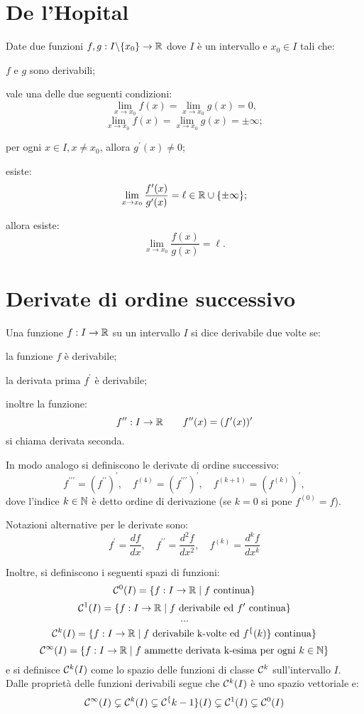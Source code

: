 \section{De l'Hopital}
\begin{teo}
Date due funzioni $f,g:I \backslash \{x_0\} \rightarrow \mathbb{R}$ dove $I$ è un intervallo e $x_0 \in I$ tali che:
\begin{aenumerate}
\item $f$ e $g$ sono derivabili;
\item vale una delle due seguenti condizioni:
\[\lim_{x\to x_0}{f(x)}=\lim_{x\to x_0}{g(x)}=0,\]
\[\lim_{x\to x_0}{f(x)}=\lim_{x\to x_0}{g(x)}=\pm\infty;\]
\item per ogni $x\in I, x\neq x_0$, allora $g^\prime(x)\neq 0$;
\item esiste:
\[\lim_{x\to x_0}{\frac{f^\prime(x)}{g^\prime(x)}}=\ell\in\mathbb{R}\cup\{\pm\infty\};\]
\end{aenumerate}
allora esiste:
\[\lim_{x\to x_0}{\frac{f(x)}{g(x)}}=\ell.\]
\end{teo}

\section{Derivate di ordine successivo}
Una funzione $f:I\rightarrow\mathbb{R}$ su un intervallo $I$ si dice derivabile due volte se:
\begin{aenumerate}
\item la funzione $f$ è derivabile;
\item la derivata prima $f^\prime$ è derivabile;
\end{aenumerate}
inoltre la funzione:
\[f^{\prime\prime}:I\rightarrow\mathbb{R} \qquad f^{\prime\prime}(x)=(f^\prime(x))^\prime\]
si chiama derivata seconda.

In modo analogo si definiscono le derivate di ordine successivo:
\[f^{\prime\prime\prime}=(f^{\prime\prime})^\prime, \quad f^{(4)}= (f^{\prime\prime\prime})^\prime, \quad f^{(k+1)}=(f^{(k)})^\prime, \]
dove l'indice $k\in\mathbb{N}$ è detto ordine di derivazione (se $k=0$ si pone $f^{(0)}=f$).

Notazioni alternative per le derivate sono:
\[f^\prime=\frac{df}{dx},\quad f^{\prime\prime}=\frac{d^2f}{dx^2}, \quad f^{(k)}=\frac{d^kf}{dx^k}\]

Inoltre, si definiscono i seguenti spazi di funzioni:
\[\mathcal{C}^0(I)=\{f:I\rightarrow\mathbb{R} \mid f\text{ continua}\}\]
\[\mathcal{C}^1(I)=\{f:I\rightarrow\mathbb{R} \mid f\text{ derivabile ed } f^\prime \text{ continua}\}\]
\[\dots\]
\[\mathcal{C}^k(I)=\{f:I\rightarrow\mathbb{R} \mid f\text{ derivabile k-volte ed } f^\{(k)\} \text{ continua}\}\]
\[\mathcal{C}^\infty(I)=\{f:I\rightarrow\mathbb{R} \mid f\text{ ammette derivata k-esima per ogni } k\in\mathbb{N}\}\]
e si definisce $\mathcal{C}^k(I)$ come lo spazio delle funzioni di classe $\mathcal{C}^k$ sull'intervallo $I$. Dalle proprietà delle funzioni derivabili segue che $\mathcal{C}^k(I)$ è uno spazio vettoriale e:
\[\mathcal{C}^\infty(I) \subsetneq \mathcal{C}^k(I) \subsetneq \mathcal{C}^\{k-1\}(I) \subsetneq \mathcal{C}^1(I) \subsetneq \mathcal{C}^0(I)\]

